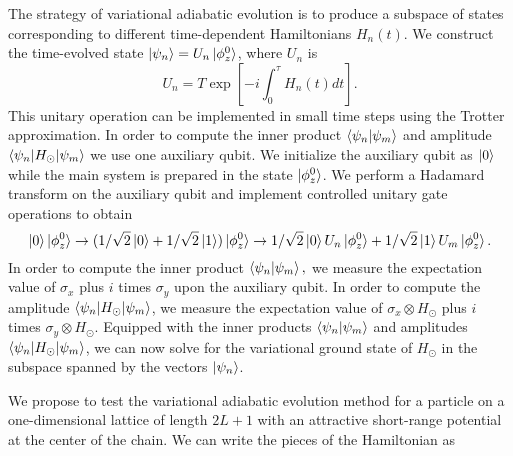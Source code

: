 \documentclass[11pt]{article}
\begin{document}
The strategy of variational adiabatic evolution is to produce a
subspace of states corresponding to different time-dependent
Hamiltonians $H_{n}(t)$.  We construct the time-evolved state
$\ket{\psi_n} = U_n\ket{\phi_z^0}$, where $U_n$ is
\begin{equation}
U_n = T \exp\left[-i\int_0^\tau H_n(t) dt \right] \label{adiabatic}.
\end{equation}
 This unitary operation can be implemented in small time steps using
 the Trotter approximation. In order to compute the inner product
 $\braket{\psi_n|\psi_m}$ and amplitude
 $\braket{\psi_n|H_\odot|\psi_m}$ we use one auxiliary qubit.  We
 initialize the auxiliary qubit as $\ket{0}$ while the main system is
 prepared in the state $\ket{\phi_z^0}$.  We perform a Hadamard
 transform on the auxiliary qubit and implement controlled unitary
 gate operations to obtain
\begin{equation}
\ket{0}\ket{\phi_z^0} \rightarrow (1/\sqrt{2}\ket{0} +1/\sqrt{2}\ket{1})\ket{\phi_z^0}
\rightarrow 1/\sqrt{2}\ket{0}U_n\ket{\phi_z^0} +1/\sqrt{2}\ket{1}U_m\ket{\phi_z^0}.
\end{equation}
In order to compute the inner product $\braket{\psi_n|\psi_m},$ we
measure the expectation value of $\sigma_x$ plus $i$ times $\sigma_y$
upon the auxiliary qubit.  In order to compute the amplitude
$\braket{\psi_n|H_\odot|\psi_m}$, we measure the expectation
value of $\sigma_x \otimes H_\odot$ plus $i$ times $\sigma_y \otimes
H_\odot$.  Equipped with the inner products $\braket{\psi_n|\psi_m}$
and amplitudes $\braket{\psi_n|H_\odot|\psi_m}$, we can now solve for
the variational ground state of $H_\odot$ in the subspace spanned by
the vectors $\ket{\psi_n}$.

We propose to test the variational adiabatic evolution method for a
particle on a one-dimensional lattice of length $2L+1$ with an
attractive short-range potential at the center of the chain.  We can
write the pieces of the Hamiltonian as
\end{document}
